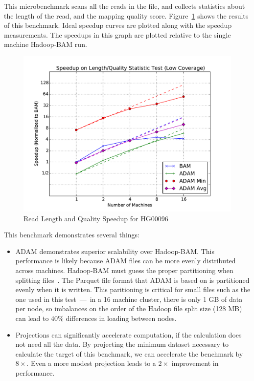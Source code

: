 \documentclass{acm_proc_article-sp}
\begin{document}
This microbenchmark scans all the reads in the file, and collects statistics about the length of the read, and the mapping quality score. Figure~\ref{fig:length-quality} shows
the results of this benchmark. Ideal speedup curves are plotted along with the speedup measurements. The speedups in this graph are plotted relative to the single machine Hadoop-BAM run.

\begin{figure}[h]
\begin{center}
\includegraphics[width=\linewidth]{microbenchmarks/length_and_quality_low_coverage.pdf}
\end{center}
\caption{Read Length and Quality Speedup for HG00096}
\label{fig:length-quality}
\end{figure}

This benchmark demonstrates several things:

\begin{itemize}
\item ADAM demonstrates superior scalability over Hadoop-BAM. This performance is likely because ADAM files can be more evenly distributed across machines.
Hadoop-BAM must guess the proper partitioning when splitting files~\cite{niemenmaa12}. The Parquet file format that ADAM is based on is partitioned
evenly when it is written\cite{parquet}. This paritioning is critical for small files such as the one used in this test~---~in a 16 machine cluster, there is only 1 GB of
data per node, so imbalances on the order of the Hadoop file split size (128 MB) can lead to 40\% differences in loading between nodes.
\item Projections can significantly accelerate computation, if the calculation does not need all the data. By projecting the minimum dataset necessary
to calculate the target of this benchmark, we can accelerate the benchmark by $8\times$. Even a more modest projection leads to a $2\times$
improvement in performance.
\end{itemize}
\end{document}
